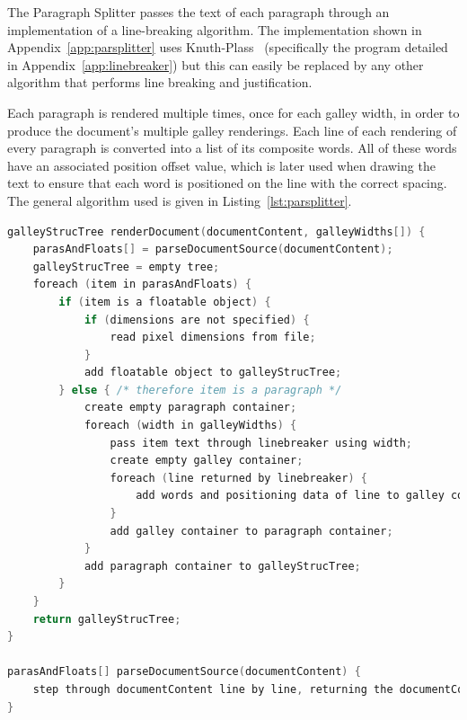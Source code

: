The Paragraph Splitter passes the text of each paragraph through an implementation of a line-breaking algorithm. The implementation shown in Appendix~\ref{app:parsplitter} uses Knuth-Plass~\cite{Knuth1981} (specifically the program detailed in Appendix~\ref{app:linebreaker}) but this can easily be replaced by any other algorithm that performs line breaking and justification.

Each paragraph is rendered multiple times, once for each galley width, in order to produce the document's multiple galley renderings. Each line of each rendering of every paragraph is converted into a list of its composite words. All of these words have an associated position offset value, which is later used when drawing the text to ensure that each word is positioned on the line with the correct spacing. The general algorithm used is given in Listing~\ref{lst:parsplitter}.


\begin{lstlisting}[label=lst:parsplitter,language=c,captionpos=b,float,basicstyle=\ttfamily\footnotesize,caption={[Algorithm used by the Paragraph Splitter]The algorithm followed by the Paragraph Splitter. Firstly the source of the document is parsed to break it into its initial logical blocks: one block per paragraph and one block per float, in the order encountered in the document source. These blocks are then processed further depending on their type. Floats may be probed for their pixel dimensions if no size was specified, and are then added to the Galley Structure Tree. Paragraphs have their content passed through a line breaking algorithm, once for each specified width.}]
galleyStrucTree renderDocument(documentContent, galleyWidths[]) {
    parasAndFloats[] = parseDocumentSource(documentContent);
    galleyStrucTree = empty tree;
    foreach (item in parasAndFloats) {
        if (item is a floatable object) {
            if (dimensions are not specified) {
                read pixel dimensions from file;
            }
            add floatable object to galleyStrucTree;
        } else { /* therefore item is a paragraph */
            create empty paragraph container;
            foreach (width in galleyWidths) {
                pass item text through linebreaker using width;
                create empty galley container;
                foreach (line returned by linebreaker) {
                    add words and positioning data of line to galley container;
                }
                add galley container to paragraph container;
            }
            add paragraph container to galleyStrucTree;
        }
    }
    return galleyStrucTree;
}

parasAndFloats[] parseDocumentSource(documentContent) {
    step through documentContent line by line, returning the documentContent broken into an array of strings with one element per paragraph and per floatable object;
}

\end{lstlisting}


